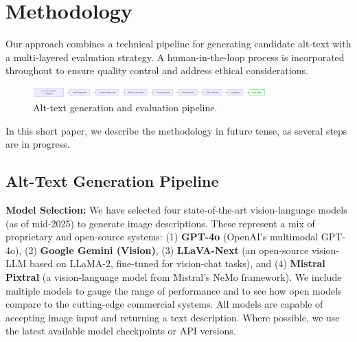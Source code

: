 \documentclass{anthology-ch}         %
\begin{document}
\section{Methodology}

Our approach combines a technical pipeline for generating candidate alt-text with a multi-layered evaluation strategy. A human-in-the-loop process is incorporated throughout to ensure quality control and address ethical considerations.

\begin{figure}[ht]
    \centering
    \includegraphics[width=0.8\textwidth]{figure1.png}
    \caption{Alt-text generation and evaluation pipeline.}
\end{figure}

In this short paper, we describe the methodology in future tense, as several steps are in progress.

\subsection{Alt-Text Generation Pipeline}

\textbf{Model Selection:} We have selected four state-of-the-art vision-language models (as of mid-2025) to generate image descriptions. These represent a mix of proprietary and open-source systems: (1) \textbf{GPT-4o} (OpenAI’s multimodal GPT-4o), (2) \textbf{Google Gemini (Vision)}, (3) \textbf{LLaVA-Next} (an open-source vision-LLM based on LLaMA-2, fine-tuned for vision-chat tasks), and (4) \textbf{Mistral Pixtral} (a vision-language model from Mistral’s NeMo framework). We include multiple models to gauge the range of performance and to see how open models compare to the cutting-edge commercial systems. All models are capable of accepting image input and returning a text description. Where possible, we use the latest available model checkpoints or API versions.
\end{document}
